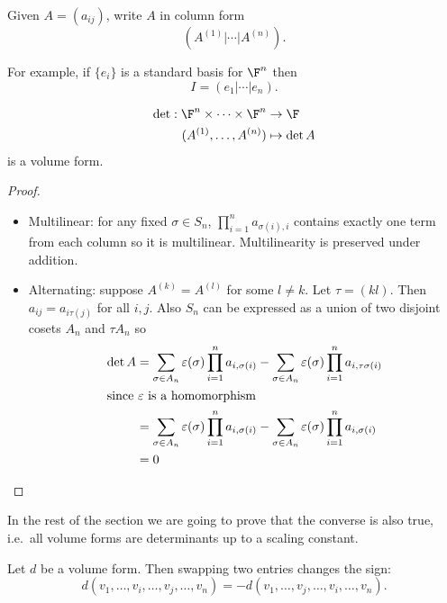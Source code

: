 \documentclass[a4paper]{article}
\theoremstyle{definition}
\begin{document}
\begin{notation}
  Given \(A = (a_{ij})\), write \(A\) in column form
  \[
    \left( A^{(1)} | \cdots | A^{(n)} \right).
  \]
\end{notation}
For example, if \(\{e_i\}\) is a standard basis for \(\F^n\) then
\[
  I = \left(e_1 | \cdots | e_n \right).
\]

\begin{lemma}
  \begin{align*}
    \det: \F^n \times \dots \times \F^n &\to \F \\
    (A^{(1)}, \dots, A^{(n)}) &\mapsto \det A
  \end{align*}
  is a volume form.
\end{lemma}

\begin{proof}\leavevmode
  \begin{itemize}
  \item Multilinear: for any fixed \(\sigma \in S_n\), \(\prod_{i = 1}^n a_{\sigma(i), i}\) contains exactly one term from each column so it is multilinear. Multilinearity is preserved under addition.
  \item Alternating: suppose \(A^{(k)} = A^{(l)}\) for some \(l \neq k\). Let \(\tau = (kl)\). Then \(a_{ij} = a_{i \tau(j)}\) for all \(i, j\). Also \(S_n\) can be expressed as a union of two disjoint cosets \(A_n\) and \(\tau A_n\) so
    \begin{align*}
      \det A &= \sum_{\sigma \in A_n}^{ } \varepsilon(\sigma) \prod_{i = 1}^n a_{i, \sigma(i)} - \sum_{\sigma \in A_n}^{ } \varepsilon(\sigma) \prod_{i = 1}^n a_{i, \tau\sigma(i)} \\
      \intertext{since \(\varepsilon\) is a homomorphism}
             &= \sum_{\sigma \in A_n}^{ } \varepsilon(\sigma) \prod_{i = 1}^n a_{i, \sigma(i)} - \sum_{\sigma \in A_n}^{ } \varepsilon(\sigma) \prod_{i = 1}^n a_{i, \sigma(i)} \\
             &= 0
    \end{align*}
  \end{itemize}
\end{proof}

In the rest of the section we are going to prove that the converse is also true, i.e.\ all volume forms are determinants up to a scaling constant.

\begin{lemma}
  Let \(d\) be a volume form. Then swapping two entries changes the sign:
  \[
    d(v_1, \dots, v_i, \dots, v_j, \dots, v_n) = - d(v_1, \dots, v_j, \dots, v_i, \dots, v_n).
  \]
\end{lemma}
\end{document}
